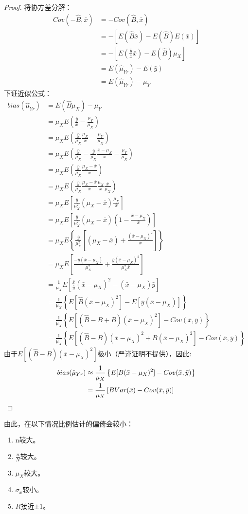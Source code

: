 \begin{proof}
	将协方差分解：
	\begin{align*}
		Cov(-\hat{B},\bar{x})&=-Cov(\hat{B},\bar{x}) \\
		&=-\left[E(\hat{B}\bar{x})-E(\hat{B})E(\bar{x})\right] \\
		&=-\left[E\left(\frac{\bar{y}}{\bar{x}}\bar{x}\right)-E(\hat{B})\mu_X\right] \\
		&=E(\hat{\mu}_{Yr})-E(\bar{y}) \\
		&=E(\hat{\mu}_{Yr})-\mu_Y
	\end{align*}
	下证近似公式：
	\begin{align*}
		bias(\hat{\mu}_{Yr})
		&=E(\hat{B}\mu_X)-\mu_Y \\
		&=\mu_XE\left(\frac{\bar{y}}{\bar{x}}-\frac{\mu_Y}{\mu_X}\right) \\
		&=\mu_XE\left(\frac{\bar{y}}{\mu_X}\frac{\mu_X}{\bar{x}}-\frac{\mu_Y}{\mu_X}\right) \\
		&=\mu_XE\left(\frac{\bar{y}}{\mu_X}-\frac{\bar{y}}{\mu_X}\frac{\bar{x}-\mu_X}{\bar{x}}-\frac{\mu_Y}{\mu_X}\right) \\
		&=\mu_XE\left(\frac{\bar{y}}{\mu_X}\frac{\mu_X-\bar{x}}{\bar{x}}\right) \\
		&=\mu_XE\left(\frac{\bar{y}}{\mu_X}\frac{\mu_X-\bar{x}}{\bar{x}}\frac{\mu_X}{\bar{x}}\frac{\bar{x}}{\mu_X}\right) \\
		&=\mu_XE\left[\frac{\bar{y}}{\mu_X^2}(\mu_X-\bar{x})\frac{\mu_X}{\bar{x}}\right] \\
		&=\mu_XE\left[\frac{\bar{y}}{\mu_X^2}(\mu_X-\bar{x})\left(1-\frac{\bar{x}-\mu_X}{\bar{x}}\right)\right] \\
		&=\mu_XE\left\{\frac{\bar{y}}{\mu_X^2}\left[(\mu_X-\bar{x})+\frac{(\bar{x}-\mu_X)^2}{\bar{x}}\right]\right\} \\
		&=\mu_XE\left[\frac{-\bar{y}(\bar{x}-\mu_X)}{\mu_X^2}+\frac{\bar{y}(\bar{x}-\mu_X)^2}{\mu_X^2\bar{x}}\right] \\
		&=\frac{1}{\mu_X}E\left[\frac{\bar{x}}{\bar{y}}(\bar{x}-\mu_X)^2-(\bar{x}-\mu_X)\bar{y}\right] \\
		&=\frac{1}{\mu_X}\left\{E[\hat{B}(\bar{x}-\mu_X)^2]-E[\bar{y}(\bar{x}-\mu_X)]\right\} \\
		&=\frac{1}{\mu_X}\left\{E[(\hat{B}-B+B)(\bar{x}-\mu_X)^2]-Cov(\bar{x},\bar{y})\right\} \\
		&=\frac{1}{\mu_X}\left\{E[(\hat{B}-B)(\bar{x}-\mu_X)^2+B(\bar{x}-\mu_X)^2]-Cov(\bar{x},\bar{y})\right\}
	\end{align*}
	由于$E\left[(\hat{B}-B)(\bar{x}-\mu_X)^2\right]$极小（严谨证明不提供），因此:
	\begin{align*}
		bias(\hat{\mu}_{Yr})&\approx\frac{1}{\mu_X}\left\{E[B(\bar{x}-\mu_X)^2]-Cov(\bar{x},\bar{y})\right\} \\
		&=\frac{1}{\mu_X}\left[BVar(\bar{x})-Cov(\bar{x},\bar{y})\right] \qedhere
	\end{align*}
\end{proof}
由此，在以下情况比例估计的偏倚会较小：
\begin{enumerate}
	\item n较大。
	\item $\frac{n}{N}$较大。
	\item $\mu_X$较大。
	\item $\sigma_x$较小。
	\item $R$接近$\pm 1$。
\end{enumerate}